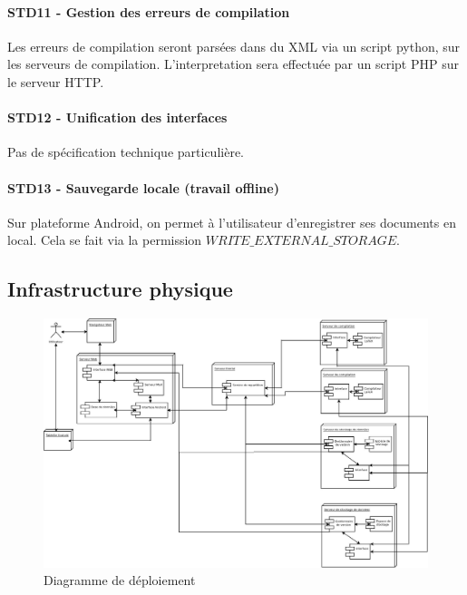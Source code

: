 \documentclass[a4paper,12pt]{article}
\begin{document}
\paragraph{STD11 - Gestion des erreurs de compilation\\}
Les erreurs de compilation seront parsées dans du XML via un script python, sur les serveurs de compilation. L'interpretation sera effectuée par un script PHP sur le serveur HTTP.

\paragraph{STD12 - Unification des interfaces\\}
Pas de spécification technique particulière.

\paragraph{STD13 - Sauvegarde locale (travail offline)\\}
Sur plateforme Android, on permet à l'utilisateur d'enregistrer ses documents en local. Cela se fait via la permission $WRITE\_EXTERNAL\_STORAGE$.



\newpage
\subsection{Infrastructure physique}

\begin{figure}[!ht]
\begin{center}
  \includegraphics[width=1\textwidth,angle=90]{./Diagramme/DiagrammeDeploiement.jpg}
\end{center}
  \caption{Diagramme de déploiement}
  \label{déploiement}
\end{figure}
\newpage
\end{document}
